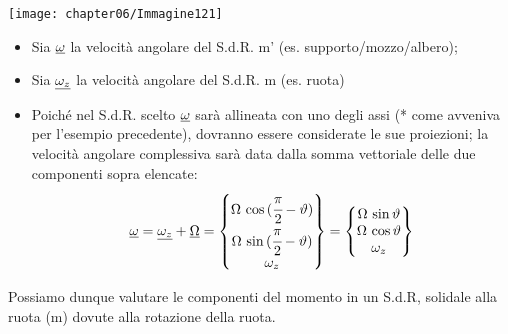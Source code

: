 	\begin{minipage}{.5\textwidth}
	\centering
	\texttt{[image: chapter06/Immagine121]}
	\end{minipage}
	\hfill
	\begin{minipage}{.5\textwidth}
		\begin{itemize}
			\item Sia $\underline{\omega}$ la velocità angolare del S.d.R. m' (es. supporto/mozzo/albero);
			\item Sia $\underline{\omega_z}$ la velocità angolare del S.d.R. m (es. ruota)
			\item Poiché nel S.d.R. scelto $\underline{\omega}$ sarà allineata con uno degli assi (* come avveniva per l'esempio precedente), dovranno essere considerate le sue proiezioni; la velocità angolare complessiva sarà data dalla somma vettoriale delle due componenti sopra elencate: 
			\[
			\underline{\omega} = \underline{\omega_z} + \underline{\Omega} = \begin{Bmatrix}\Omega\,\cos{(\cfrac{\pi}{2}-\vartheta)}\\\Omega\,\sin{(\cfrac{\pi}{2}-\vartheta)}\\\omega_z\end{Bmatrix} = \begin{Bmatrix}\Omega\,\sin{\vartheta}\\\Omega\,\cos{\vartheta}\\\omega_z\end{Bmatrix}
			\]
		\end{itemize}
	\end{minipage}
	\vspace{1mm}
	
	Possiamo dunque valutare le componenti del momento in un S.d.R, solidale alla ruota (m) dovute alla rotazione della ruota.
	
